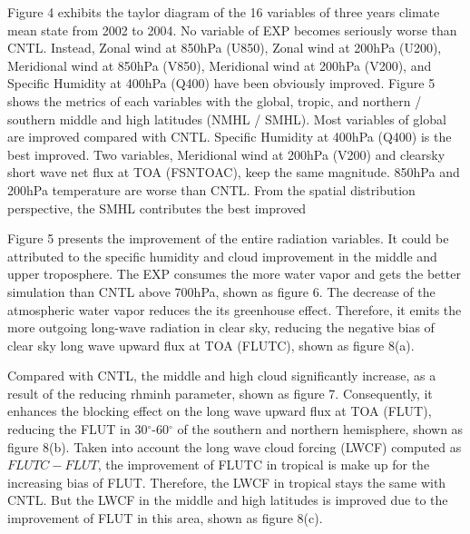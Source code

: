 \documentclass[gmd, manuscript]{copernicus}
\begin{document}
Figure 4 exhibits the taylor diagram of the 16 variables of three years climate mean state from 2002 to 2004.  No variable of EXP becomes seriously worse than CNTL. Instead,  Zonal wind at 850hPa (U850),  Zonal wind at 200hPa (U200), Meridional wind at 850hPa (V850), Meridional wind at 200hPa (V200), and Specific Humidity at 400hPa (Q400) have been obviously improved. Figure 5 shows the metrics of each variables with the global, tropic, and northern / southern middle and high latitudes (NMHL / SMHL). Most variables of global are improved compared with CNTL. Specific Humidity at 400hPa (Q400) is the best improved. Two variables, Meridional wind at 200hPa (V200) and clearsky short wave net flux at TOA (FSNTOAC), keep the same magnitude. 850hPa and 200hPa temperature are worse than CNTL. From the spatial distribution perspective, the SMHL contributes the best improved


Figure 5 presents the improvement of the entire radiation variables. It could be attributed to the specific humidity and cloud improvement in the middle and upper troposphere. The EXP consumes the more water vapor and gets the better simulation than CNTL above 700hPa, shown as figure 6. The decrease of the atmospheric water vapor reduces the its greenhouse effect. Therefore, it emits the more outgoing long-wave radiation in clear sky, reducing the negative bias of clear sky long wave upward flux at TOA (FLUTC), shown as figure 8(a).


Compared with CNTL, the middle and high cloud significantly increase, as a result of the reducing rhminh parameter, shown as figure 7. Consequently, it enhances the blocking effect on the long wave upward flux at TOA (FLUT), reducing the FLUT in 30$^\circ$-60$^\circ$ of the southern and northern hemisphere, shown as figure 8(b). Taken into account the long wave cloud forcing (LWCF) computed as $FLUTC - FLUT$, the improvement of FLUTC in tropical is make up for the increasing bias of FLUT. Therefore, the LWCF in tropical stays the same with CNTL. But the LWCF in the middle and high latitudes is improved due to the improvement of FLUT in this area, shown as figure 8(c). 



\conclusions  %
\end{document}
